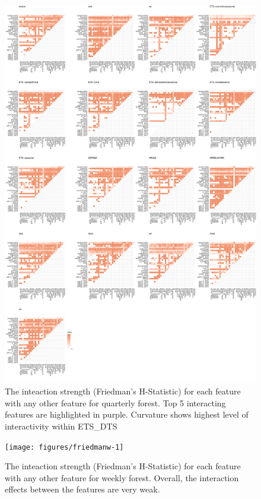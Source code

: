 \documentclass[11pt,a4paper,]{article}
\begin{document}
\begin{figure}
\centering
\includegraphics{figures/friedmanm-1.pdf}
\caption{\label{fig:friedmanm}The inteaction strength (Friedman's H-Statistic) for each feature with any other feature for quarterly forest. Top 5 interacting features are highlighted in purple. Curvature shows highest level of interactivity within ETS\_DTS}
\end{figure}

\begin{figure}[h]

{\centering \texttt{[image: figures/friedmanw-1]} 

}

\caption{The inteaction strength (Friedman's H-Statistic) for each feature with any other feature for weekly forest. Overall, the interaction effects between the features are very weak.}\label{fig:friedmanw}
\end{figure}
\end{document}
